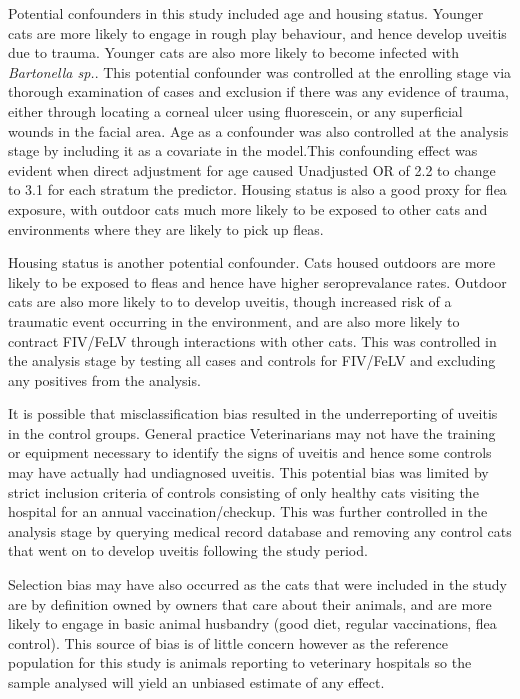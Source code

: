 \documentclass[11pt,twocolumn]{article}
\begin{document}
		Potential confounders in this study included age and housing status. 
		Younger cats are more likely to engage in rough play behaviour, and hence develop uveitis due to trauma. Younger cats are also more likely to become infected with \emph{Bartonella sp.}\cite{Brunt2006}.
		This potential confounder was controlled at the enrolling stage via thorough examination of cases and exclusion if there was any evidence of trauma, either through locating a corneal ulcer using fluorescein, or any superficial wounds in the facial area.
		Age as a confounder was also controlled at the analysis stage by including it as a covariate in the model.This confounding effect was evident when direct adjustment for age caused Unadjusted OR of 2.2 to change to 3.1 for each stratum the predictor.
		Housing status is also a good proxy for flea exposure, with outdoor cats much more likely to be exposed to other cats and environments where they are likely to pick up fleas.

		
		Housing status is another potential confounder. Cats housed outdoors are more likely to be exposed to fleas and hence have higher seroprevalance rates.
		Outdoor cats are also more likely to to develop uveitis, though increased risk of a traumatic event occurring in the environment, and are also more likely to contract FIV/FeLV through interactions with other cats.
		This was controlled in the analysis stage by testing all cases and controls for FIV/FeLV and excluding any positives from the analysis.


		It is possible that misclassification bias resulted in the underreporting of uveitis in the control groups. General practice Veterinarians may not have the training or equipment necessary to identify the signs of uveitis and hence some controls may have actually had undiagnosed uveitis.
		This potential bias was limited by strict inclusion criteria of controls consisting of only healthy cats visiting the hospital for an annual vaccination/checkup. 
		This was further controlled in the analysis stage by querying medical record database and removing any control cats that went on to develop uveitis following the study period.


		Selection bias may have also occurred as the cats that were included in the study are by definition owned by owners that care about their animals, and are more likely to engage in basic animal husbandry (good diet, regular vaccinations, flea control).
		This source of bias is of little concern however as the reference population for this study is animals reporting to veterinary hospitals so the sample analysed will yield an unbiased estimate of any effect.
\end{document}
